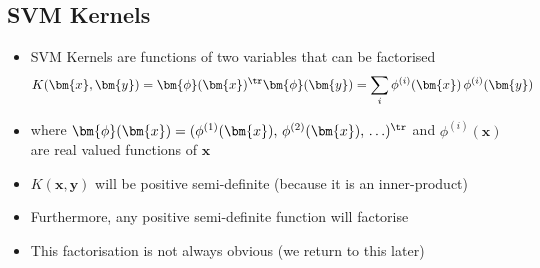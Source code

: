 \begin{slide}
\section[-2]{SVM Kernels}

\begin{PauseHighLight}
  \begin{itemize}
  \item SVM Kernels are functions of two variables that can be factorised
    \begin{align*}
      K(\bm{x},\bm{y}) = \bm{\phi}(\bm{x})^\tr\bm{\phi}(\bm{y}) =
      \sum_{i} \phi^{(i)}(\bm{x})\,\phi^{(i)}(\bm{y})
    \end{align*}
  \item where $\bm{\phi}(\bm{x}) = (\phi^{(1)}(\bm{x}),\, \phi^{(2)}(\bm{x}),\,
    \ldots)^\tr$ and $\phi^{(i)}(\bm{x})$ are real valued functions of
    $\bm{x}$\pause
  \item $K(\bm{x},\bm{y})$ will be positive semi-definite (because it
    is an inner-product)\pause
  \item Furthermore, any positive semi-definite function will
    factorise\pause
  \item This factorisation is not always obvious (we return to this
    later)\pause
  \end{itemize}
\end{PauseHighLight}

\end{slide}



